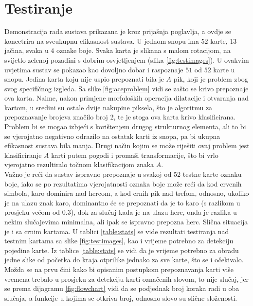 \documentclass[times, zavrsni, numeric, utf8]{fer}
\begin{document}
\chapter{Testiranje}
\label{chap:test}
\hspace*{0.5cm}Demonstracija rada sustava prikazana je kroz prijašnja poglavlja, a ovdje se koncetrira na sveukupnu efikasnost sustava. U jednom snopu ima $52$ karte, $13$ jačina, svaka u $4$ oznake boje. Svaka karta je slikana s malom rotacijom, na svijetlo zelenoj pozadini s dobrim osvjetljenjem (slika \ref{fig:testimages}). U ovakvim uvjetima sustav se pokazao kao dovoljno dobar i raspoznaje $51$ od $52$ karte u snopu. Jedina karta koju nije uspio prepoznati bila je $A$ pik, koji je problem zbog svog specifičnog izgleda. Sa slike \ref{fig:aceproblem} vidi se zašto se krivo prepoznaje ova karta. Naime, nakon primjene morfoloških operacija dilatacije i otvaranja nad kartom, u sredini su ostale dvije nakupine piksela, što je algoritmu za prepoznavanje brojeva značilo broj 2, te je stoga ova karta krivo klasificirana. Problem bi se mogao izbjeći s korištenjem drugog strukturnog elementa, ali to bi se vjerojatno negativno odrazilo na ostatak karti iz snopa, pa bi ukupna efikasnost sustava bila manja. Drugi način kojim se može riješiti ovaj problem jest klasificiranje $A$ karti putem pogodi i promaši transformacije, što bi vrlo vjerojatno rezultiralo točnom klasifikacijom znaka $A$. \\
Važno je reći da sustav ispravno prepoznaje u svakoj od 52 testne karte oznaku boje, iako se po rezultatima vjerojatnosti oznaka boje može reći da kod crvenih simbola, karo dominira nad hercom, a kod crnih pik nad trefom, odnosno, ukoliko je na ulazu znak karo, dominantno će se prepoznati da je to karo (s razlikom u prosjeku većom od $0.3$), dok za slučaj kada je na ulazu herc, onda je razlika u nekim slučajevima minimalna, ali ipak se ispravno prepozna herc. Slična situacija je i sa crnim kartama. U tablici \ref{table:stats} se vide rezultati testiranja nad testnim kartama sa slike \ref{fig:testimages}, kao i vrijeme potrebno za detekciju pojedine karte. 
Iz tablice {\ref{table:stats}} se vidi da je vrijeme potrebno za obradu jedne slike od početka do kraja otprilike jednako za sve karte, što se i očekivalo. Možda se na prvu čini kako bi opisanim postupkom prepoznavanja karti više vremena trebalo u prosjeku za detekciju karti označenih slovom, to nije slučaj, jer se prema dijagramu \ref{fig:flowchart} vidi da se podjednak broj koraka radi u oba slučaja, a funkcije u kojima se otkriva broj, odnosno slovo su slične složenosti. 
\end{document}
